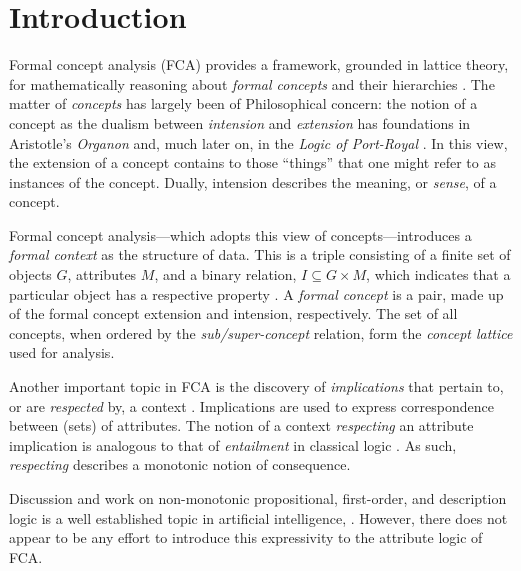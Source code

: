 \section{Introduction}
\label{section: introduction}

Formal concept analysis (FCA) provides a framework, grounded in lattice theory, for mathematically reasoning about \textit{formal concepts} and their hierarchies \cite{ganter1999formal,ganter2016conceptual,rudolph2007relational}. The matter of \textit{concepts} has largely been of Philosophical concern: the notion of a concept as the dualism between \textit{intension} and \textit{extension} has foundations in Aristotle's \textit{Organon} and, much later on, in the \textit{Logic of Port-Royal} \cite{rudolph2007relational,castonguay2012meaning}. In this view, the extension of a concept contains to those ``things'' that one might refer to as instances of the concept. Dually, intension describes the meaning, or \textit{sense}, of a concept.

Formal concept analysis---which adopts this view of concepts---introduces a \textit{formal context} as the structure of data. This is a triple consisting of a finite set of objects $G$, attributes $M$, and a binary relation, $I \subseteq G\times M$, which indicates that a particular object has a respective property \cite{ganter1999formal,ganter2016conceptual}. A \textit{formal concept} is a pair, made up of the formal concept extension and intension, respectively. The set of all concepts, when ordered by the \textit{sub/super-concept} relation, form the \textit{concept lattice} used for analysis.


Another important topic in FCA is the discovery of \textit{implications} that pertain to, or are \textit{respected} by, a context \cite{rudolph2007relational,ganter1999formal}. Implications are used to express correspondence between (sets) of attributes. The notion of a context \textit{respecting} an attribute implication is analogous to that of \textit{entailment} in classical logic \cite{ganter2016conceptual}. As such, \textit{respecting} describes a monotonic notion of consequence.

Discussion and work on non-monotonic propositional, first-order, and description logic is a well established topic in artificial intelligence, \cite{ferguson2003monotonicity,giordano2015semantic,kraus1990nonmonotonic,lehmann1994what,shoham1987nonmonotonic}. However, there does not appear to be any effort to introduce this expressivity to the attribute logic of FCA.


